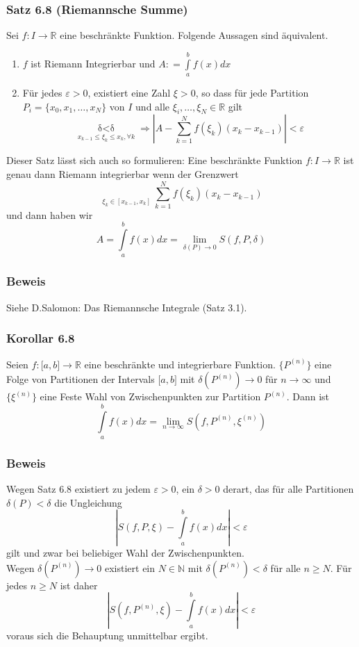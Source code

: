 \subsubsection*{Satz 6.8 (Riemannsche Summe)}
Sei $f:I\rightarrow \mathbb{R}$ eine beschränkte Funktion. Folgende Aussagen sind äquivalent.
\begin{enumerate}[\indent I)]
\item $f$ ist Riemann Integrierbar und $A: = \int\limits_a^b {f(x)dx} $
\item Für jedes $\varepsilon>0$, existiert eine Zahl $\xi>0$, so dass für jede Partition $P_i=\{x_0,x_1,\dots,x_N\}$ von $I$ und alle $\xi_i,\dots,\xi_N \in \mathbb{R}$ gilt $$\mathop {\delta (P) < \delta }\limits_{{x_{k - 1}} \le {\xi _k} \le {x_k},\forall k}  \Rightarrow \left| {A - \sum\limits_{k = 1}^N {f({\xi _k})({x_k} - {x_{k - 1}})} } \right| < \varepsilon $$
\end{enumerate}
Dieser Satz lässt sich auch so formulieren: Eine beschränkte Funktion $f:I\rightarrow\mathbb{R}$ ist genau dann Riemann integrierbar wenn der Grenzwert $$\mathop {\mathop {\lim }\limits_{\delta (P) \to 0} }\limits_{{\xi _k} \in [{x_{k - 1}},{x_k}]} \sum\limits_{k = 1}^N {f({\xi _k})({x_k} - {x_{k - 1}})} $$ und dann haben wir $$A=\int\limits_a^b {f(x)dx = \mathop {\lim }\limits_{\delta (P) \to 0} } S(f,P,\delta )$$

\subsubsection*{Beweis} Siehe D.Salomon: Das Riemannsche Integrale (Satz 3.1).
\subsubsection*{Korollar 6.8}
Seien $f:\lbrack a,b\rbrack\rightarrow\mathbb{R}$ eine beschränkte und integrierbare Funktion. $\{ P^{(n)}\}$ eine Folge von Partitionen der Intervals $\lbrack a,b\rbrack$ mit $\delta(P^{(n)})\rightarrow 0$ für $n\rightarrow\infty$ und $\{\xi^{(n)}\}$ eine Feste Wahl von Zwischenpunkten zur Partition $P^{(n)}$. Dann ist
\[\int\limits_a^b {f(x)dx = \mathop {\lim }\limits_{n \to \infty } S(f,{P^{(n)}},{\xi ^{(n)}})} \]
\subsubsection*{Beweis}
Wegen Satz 6.8 existiert zu jedem $\varepsilon>0$, ein $\delta>0$ derart, das für alle Partitionen $\delta(P)<\delta$ die Ungleichung 
\[\left| {S(f,P,\xi ) - \int\limits_a^b {f(x)dx} } \right| < \varepsilon \]
gilt und zwar bei beliebiger Wahl der Zwischenpunkten.\\
Wegen  $\delta(P^{(n)})\rightarrow 0$ existiert ein $N\in\mathbb{N}$ mit $\delta(P^{(n)})<\delta$ für alle $n\geq N$.
Für jedes $n\geq N$ ist daher \[\left| {S(f,{P^{(n)}},\xi ) - \int\limits_a^b {f(x)dx} } \right| < \varepsilon \] voraus sich die Behauptung unmittelbar ergibt. 
